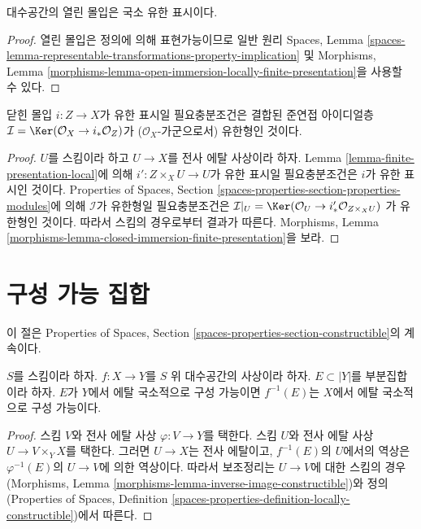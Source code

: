 \begin{lemma}
\label{lemma-open-immersion-locally-finite-presentation}
대수공간의 열린 몰입은 국소 유한 표시이다.
\end{lemma}

\begin{proof}
열린 몰입은 정의에 의해 표현가능이므로 일반 원리
Spaces, Lemma
\ref{spaces-lemma-representable-transformations-property-implication} 및
Morphisms, Lemma
\ref{morphisms-lemma-open-immersion-locally-finite-presentation}을
사용할 수 있다.
\end{proof}

\begin{lemma}
\label{lemma-closed-immersion-finite-presentation}
닫힌 몰입 $i : Z \to X$가 유한 표시일 필요충분조건은
결합된 준연접 아이디얼층
$\mathcal{I} = \Ker(\mathcal{O}_X \to i_*\mathcal{O}_Z)$가
($\mathcal{O}_X$-가군으로서) 유한형인 것이다.
\end{lemma}

\begin{proof}
$U$를 스킴이라 하고 $U \to X$를 전사 에탈 사상이라 하자.
Lemma \ref{lemma-finite-presentation-local}에 의해
$i' : Z \times_X U \to U$가 유한 표시일 필요충분조건은
$i$가 유한 표시인 것이다. Properties of Spaces, Section
\ref{spaces-properties-section-properties-modules}에 의해
$\mathcal{I}$가 유한형일 필요충분조건은
$\mathcal{I}|_U = \Ker(\mathcal{O}_U \to i'_*\mathcal{O}_{Z \times_X U})$
가 유한형인 것이다. 따라서 스킴의 경우로부터 결과가 따른다.
Morphisms, Lemma
\ref{morphisms-lemma-closed-immersion-finite-presentation}을 보라.
\end{proof}

\section{구성 가능 집합}
\label{section-constructible}

\noindent
이 절은 Properties of Spaces, Section
\ref{spaces-properties-section-constructible}의 계속이다.

\begin{lemma}
\label{lemma-inverse-image-constructible}
$S$를 스킴이라 하자.
$f : X \to Y$를 $S$ 위 대수공간의 사상이라 하자.
$E \subset |Y|$를 부분집합이라 하자.
$E$가 $Y$에서 에탈 국소적으로 구성 가능이면
$f^{-1}(E)$는 $X$에서 에탈 국소적으로 구성 가능이다.
\end{lemma}

\begin{proof}
스킴 $V$와 전사 에탈 사상 $\varphi : V \to Y$를 택한다.
스킴 $U$와 전사 에탈 사상 $U \to V \times_Y X$를 택한다.
그러면 $U \to X$는 전사 에탈이고, $f^{-1}(E)$의 $U$에서의
역상은 $\varphi^{-1}(E)$의 $U \to V$에 의한 역상이다.
따라서 보조정리는 $U \to V$에 대한 스킴의 경우
(Morphisms, Lemma \ref{morphisms-lemma-inverse-image-constructible})와
정의(Properties of Spaces, Definition
\ref{spaces-properties-definition-locally-constructible})에서 따른다.
\end{proof}

